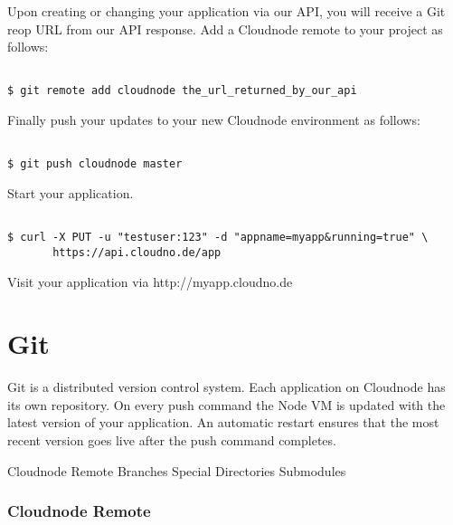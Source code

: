 Upon creating or changing your application via our API, you will receive a Git reop URL from our API response. Add a Cloudnode remote to your project as follows:

\begin{adjustwidth}{2.5em}{2.5em}
\begin{verbatim}

$ git remote add cloudnode the_url_returned_by_our_api

\end{verbatim}
\end{adjustwidth}

Finally push your updates to your new Cloudnode environment as follows:

\begin{adjustwidth}{2.5em}{2.5em}
\begin{verbatim}

$ git push cloudnode master

\end{verbatim}
\end{adjustwidth}

Start your application.

\begin{adjustwidth}{2.5em}{2.5em}
\begin{verbatim}

$ curl -X PUT -u "testuser:123" -d "appname=myapp&running=true" \
       https://api.cloudno.de/app  

\end{verbatim}
\end{adjustwidth}

Visit your application via http:/\slash myapp.cloudno.de

\chapter{Git}
\label{git}

Git is a distributed version control system. Each application on Cloudnode has its own repository. On every push command the Node VM is updated with the latest version of your application. An automatic restart ensures that the most recent version goes live after the push command completes.

Cloudnode Remote
Branches
Special Directories
Submodules

\subsection{Cloudnode Remote}
\label{cloudnoderemote}


